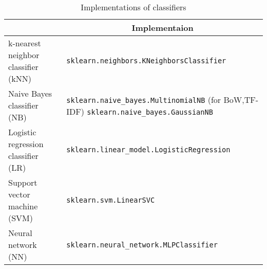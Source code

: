 \begin{table}[h]
\centering
\caption{Implementations of classifiers}
\label{tab:classifiers}
\begin{tabular}{|l|p{}|}
\hline
                                    & \multicolumn{1}{c|}{Implementaion}                                                       \\ \hline
k-nearest neighbor classifier (kNN) & \texttt{sklearn.neighbors.KNeighborsClassifier}                                          \\ \hline
Naive Bayes classifier (NB)         & \texttt{sklearn.naive\_bayes.MultinomialNB} (for BoW,TF-IDF) \texttt{sklearn.naive\_bayes.GaussianNB} \\ \hline
Logistic regression classifier (LR) & \texttt{sklearn.linear\_model.LogisticRegression}                                        \\ \hline
Support vector machine (SVM)        & \texttt{sklearn.svm.LinearSVC}                                                            \\ \hline
Neural network (NN)                 & \texttt{sklearn.neural\_network.MLPClassifier}                                            \\ \hline
\end{tabular}
\end{table}